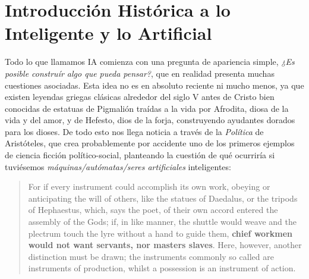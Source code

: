 \documentclass[12pt]{memoir}
\begin{document}
\newpage
\thispagestyle{empty}

\DoubleSpacing




\begin{KeepFromToc}
  \tableofcontents
\end{KeepFromToc}
\newpage



\chapter{Introducción Histórica a lo Inteligente y lo Artificial}

Todo lo que llamamos IA comienza con una pregunta de apariencia simple, \textit{¿Es posible construír algo que pueda pensar?}, que en realidad presenta muchas cuestiones asociadas. Esta idea no es en absoluto reciente ni mucho menos, ya que existen leyendas griegas clásicas alrededor del siglo V antes de Cristo bien conocidas de estatuas de Pigmalión traídas a la vida por Afrodita, diosa de la vida y del amor, y de Hefesto, dios de la forja, construyendo ayudantes dorados para los dioses. De todo esto nos llega noticia a través de la \textit{Política} de Aristóteles, que crea probablemente por accidente uno de los primeros ejemplos de ciencia ficción político-social, planteando la cuestión de qué ocurriría si tuviésemos \textit{máquinas/autómatas/seres artificiales} inteligentes:

\blockquote{For if every instrument could accomplish its own work, obeying or anticipating the will of others, like the statues of Daedalus, or the tripods of Hephaestus, which, says the poet,
of their own accord entered the assembly of the Gods; if, in like manner, the shuttle would weave and the plectrum touch the lyre without a hand to guide them, \textbf{chief workmen would not want servants, nor masters slaves}. Here, however, another distinction must be drawn; the instruments commonly so called are instruments of production, whilst a possession is an instrument of action. \parencite{aristotlePolitics}}
\end{document}
